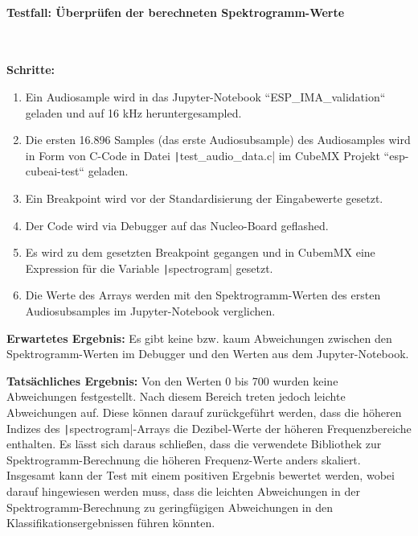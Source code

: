 \paragraph{Testfall: Überprüfen der berechneten Spektrogramm-Werte}\mbox{}\\
\begin{adjustwidth}{0.5cm}{0cm}
\textbf{Schritte:}
\begin{enumerate}
	\item Ein Audiosample wird in das Jupyter-Notebook ``ESP\_IMA\_validation`` geladen und auf 16 kHz heruntergesampled.
	\item Die ersten 16.896 Samples (das erste Audiosubsample) des Audiosamples wird in Form von C-Code in Datei \texttt|test_audio_data.c| im CubeMX Projekt ``esp-cubeai-test`` geladen.
	\item Ein Breakpoint wird vor der Standardisierung der Eingabewerte gesetzt.
	\item Der Code wird via Debugger auf das Nucleo-Board geflashed.
	\item Es wird zu dem gesetzten Breakpoint gegangen und in CubemMX eine Expression für die Variable \texttt|spectrogram| gesetzt.
	\item Die Werte des Arrays werden mit den Spektrogramm-Werten des ersten Audiosubsamples im Jupyter-Notebook verglichen.
\end{enumerate}

\textbf{Erwartetes Ergebnis:} Es gibt keine bzw. kaum Abweichungen zwischen den Spektrogramm-Werten im Debugger  und den Werten aus dem Jupyter-Notebook.

\textbf{Tatsächliches Ergebnis:} Von den Werten 0 bis 700 wurden keine Abweichungen festgestellt. Nach diesem Bereich treten jedoch leichte Abweichungen auf. Diese können darauf zurückgeführt werden, dass die höheren Indizes des \texttt|spectrogram|-Arrays die Dezibel-Werte der höheren Frequenzbereiche enthalten. Es lässt sich daraus schließen, dass die verwendete Bibliothek zur Spektrogramm-Berechnung die höheren Frequenz-Werte anders skaliert. Insgesamt kann der Test mit einem positiven Ergebnis bewertet werden, wobei darauf hingewiesen werden muss, dass die leichten Abweichungen in der Spektrogramm-Berechnung zu geringfügigen Abweichungen in den Klassifikationsergebnissen führen könnten.
\end{adjustwidth}


